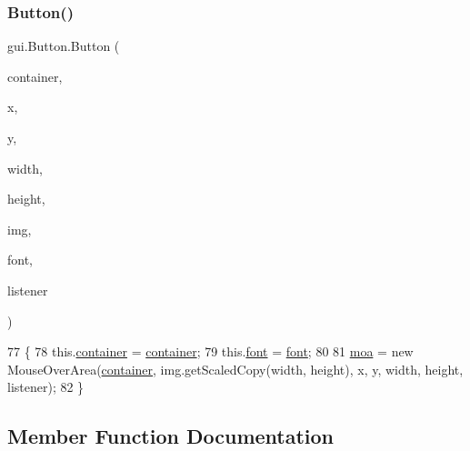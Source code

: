 \subsubsection{\texorpdfstring{Button()}{Button()}\hspace{0.1cm}{\footnotesize\ttfamily [4/4]}}
{\footnotesize\ttfamily gui.\+Button.\+Button (\begin{DoxyParamCaption}\item[{\mbox{\hyperlink{classorg_1_1newdawn_1_1slick_1_1_game_container}{Game\+Container}}}]{container,  }\item[{int}]{x,  }\item[{int}]{y,  }\item[{int}]{width,  }\item[{int}]{height,  }\item[{\mbox{\hyperlink{classorg_1_1newdawn_1_1slick_1_1_image}{Image}}}]{img,  }\item[{\mbox{\hyperlink{classgui_1_1_g_u_i_font}{G\+U\+I\+Font}}}]{font,  }\item[{\mbox{\hyperlink{interfaceorg_1_1newdawn_1_1slick_1_1gui_1_1_component_listener}{Component\+Listener}}}]{listener }\end{DoxyParamCaption})\hspace{0.3cm}{\ttfamily [inline]}}


\begin{DoxyCode}
77                                                                                                            
                                \{
78         this.\mbox{\hyperlink{classgui_1_1_button_a91cd8f6ba1fa010f564dcbc4561ce9a7}{container}} = \mbox{\hyperlink{classgui_1_1_button_a91cd8f6ba1fa010f564dcbc4561ce9a7}{container}};
79         this.\mbox{\hyperlink{classgui_1_1_button_a7f22b2fc3bd45d47a55a2d3ef20e5452}{font}} = \mbox{\hyperlink{classgui_1_1_button_a7f22b2fc3bd45d47a55a2d3ef20e5452}{font}};
80 
81         \mbox{\hyperlink{classgui_1_1_button_abccfc83b8fee5280bf5022b3b211054e}{moa}} = \textcolor{keyword}{new} MouseOverArea(\mbox{\hyperlink{classgui_1_1_button_a91cd8f6ba1fa010f564dcbc4561ce9a7}{container}}, img.getScaledCopy(width, height), x, y, width, 
      height, listener);
82     \}
\end{DoxyCode}


\subsection{Member Function Documentation}
\mbox{\label{classgui_1_1_button_a0963af10c0ebfda675428cf6692e3df5}} 
